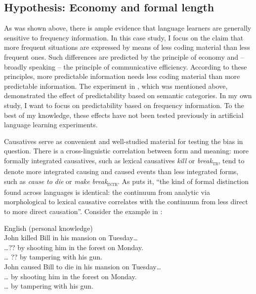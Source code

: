 \documentclass[output=paper]{langsci/langscibook}
\begin{document}
\subsection{Hypothesis: Economy and formal length}

As was shown above, there is ample evidence that language learners are generally sensitive to frequency information. In this case study, I focus on the claim that more frequent situations are expressed by means of less coding material than less frequent ones. Such differences are predicted by the principle of economy and – broadly speaking – the principle of communicative efficiency. According to these principles, more predictable information needs less coding material than more predictable information. The experiment in \citet{FedzechkinaEtAl2012}, which was mentioned above, demonstrated the effect of predictability based on semantic categories. In my own study, I want to focus on predictability based on frequency information. To the best of my knowledge, these effects have not been tested previously in artificial language learning experiments. 

Causatives serve as convenient and well-studied material for testing the bias in question. There is a cross-linguistic correlation between form and meaning: more formally integrated causatives, such as lexical causatives \textit{kill} or \textit{break}\textsc{\textsubscript{tr}}, tend to denote more integrated causing and caused events than less integrated forms, such as \textit{cause} \textit{to} \textit{die} or \textit{make} \textit{break}\textsc{\textsubscript{intr}}. As \citet[165]{Comrie1981} puts it, “the kind of formal distinction found across languages is identical: the continuum from analytic via morphological to lexical causative correlates with the continuum from less direct to more direct causation”. Consider the example in :

\ea
{English (personal knowledge)}\\ 
  \ea John killed Bill in his mansion on Tuesday… \\
    \ea …?? by shooting him in the forest on Monday.\\
    \ex … ?? by tampering with his gun.\\
    \z
  \ex  John caused Bill to die in his mansion on Tuesday…\\
    \ea … by shooting him in the forest on Monday.\\
    \ex … by tampering with his gun.\\
    \z
  \z
\z
\end{document}
